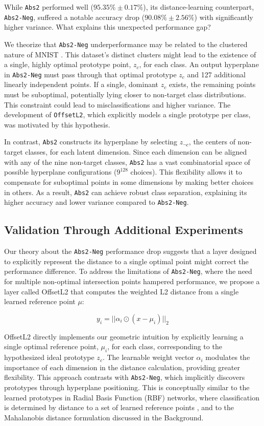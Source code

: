 While \texttt{Abs2} performed well ($95.35\% \pm 0.17\%$), its distance-learning counterpart, \texttt{Abs2-Neg}, suffered a notable accuracy drop ($90.08\% \pm 2.56\%$) with significantly higher variance. What explains this unexpected performance gap?

We theorize that \texttt{Abs2-Neg} underperformance may be related to the clustered nature of MNIST \cite{deng2012mnist, perez2017effectiveness}. This dataset's distinct clusters might lead to the existence of a single, highly optimal prototype point, $z_c$, for each class. An output hyperplane in \texttt{Abs2-Neg} must pass through that optimal prototype $z_c$ and 127 additional linearly independent points. If a single, dominant $z_c$ exists, the remaining points must be suboptimal, potentially lying closer to non-target class distributions. This constraint could lead to misclassifications and higher variance. The development of \texttt{OffsetL2}, which explicitly models a single prototype per class, was motivated by this hypothesis.

In contrast, \texttt{Abs2} constructs its hyperplane by selecting $z_{\neg c}$, the centers of non-target classes, for each latent dimension. Since each dimension can be aligned with any of the nine non-target classes, \texttt{Abs2} has a vast combinatorial space of possible hyperplane configurations ($9^{128}$ choices). This flexibility allows it to compensate for suboptimal points in some dimensions by making better choices in others. As a result, \texttt{Abs2} can achieve robust class separation, explaining its higher accuracy and lower variance compared to \texttt{Abs2-Neg}.

\subsection{Validation Through Additional Experiments}

Our theory about the \texttt{Abs2-Neg} performance drop suggests that a layer designed to explicitly represent the distance to a single optimal point might correct the performance difference. To address the limitations of \texttt{Abs2-Neg}, where the need for multiple non-optimal intersection points hampered performance, we propose a layer called OffsetL2 that computes the weighted L2 distance from a single learned reference point $\mu$:

\[
y_i = || \alpha_i \odot (x - \mu_i) ||_2
\]

OffsetL2 directly implements our geometric intuition by explicitly learning a single optimal reference point, $\mu_i$, for each class, corresponding to the hypothesized ideal prototype $z_c$. The learnable weight vector $\alpha_i$ modulates the importance of each dimension in the distance calculation, providing greater flexibility. This approach contrasts with \texttt{Abs2-Neg}, which implicitly discovers prototypes through hyperplane positioning. This is conceptually similar to the learned prototypes in Radial Basis Function (RBF) networks, where classification is determined by distance to a set of learned reference points \cite{moody1989fast}, and to the Mahalanobis distance formulation discussed in the Background.

